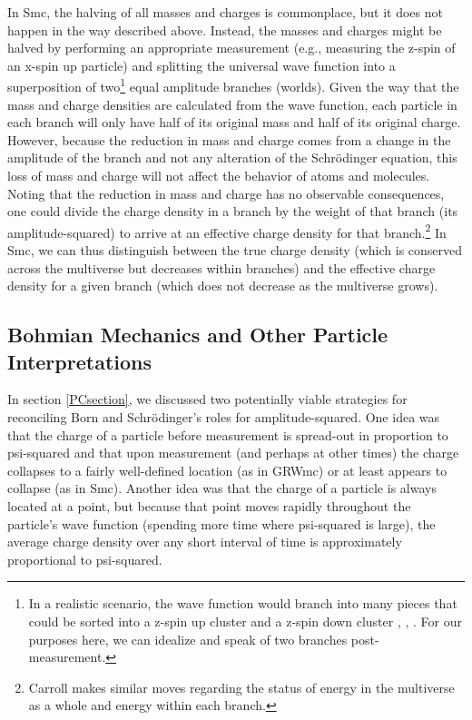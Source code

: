 \documentclass[onecolumn,secnumarabic,amsmath,amssymb,balancelastpage,nofootinbib]{article}
\begin{document}
In Smc, the halving of all masses and charges is commonplace, but it does not happen in the way described above.  Instead, the masses and charges might be halved by performing an appropriate measurement (e.g., measuring the z-spin of an x-spin up particle) and splitting the universal wave function into a superposition of two\footnote{In a realistic scenario, the wave function would branch into many pieces that could be sorted into a z-spin up cluster and a z-spin down cluster \cite[sec.\ 9]{wallace2007}, \cite{wallace2010}, \cite[sec.\ 3.11]{wallaceQM}.  For our purposes here, we can idealize and speak of two branches post-measurement.} equal amplitude branches (worlds).  Given the way that the mass and charge densities are calculated from the wave function, each particle in each branch will only have half of its original mass and half of its original charge.  However, because the reduction in mass and charge comes from a change in the amplitude of the branch and not any alteration of the Schr\"{o}dinger equation, this loss of mass and charge will not affect the behavior of atoms and molecules.  Noting that the reduction in mass and charge has no observable consequences, one could divide the charge density in a branch by the weight of that branch (its amplitude-squared) to arrive at an effective charge density for that branch.\footnote{Carroll \cite[ch.\ 8]{carroll2019} makes similar moves regarding the status of energy in the multiverse as a whole and energy within each branch.}  In Smc, we can thus distinguish between the true charge density (which is conserved across the multiverse but decreases within branches) and the effective charge density for a given branch (which does not decrease as the multiverse grows).

\subsection{Bohmian Mechanics and Other Particle Interpretations}\label{BMsection}

In section \ref{PCsection}, we discussed two potentially viable strategies for reconciling Born and Schr\"{o}dinger's roles for amplitude-squared.  One idea was that the charge of a particle before measurement is spread-out in proportion to psi-squared and that upon measurement (and perhaps at other times) the charge collapses to a fairly well-defined location (as in GRWmc) or at least appears to collapse (as in Smc).  Another idea was that the charge of a particle is always located at a point, but because that point moves rapidly throughout the particle's wave function (spending more time where psi-squared is large), the average charge density over any short interval of time is approximately proportional to psi-squared.
\end{document}
